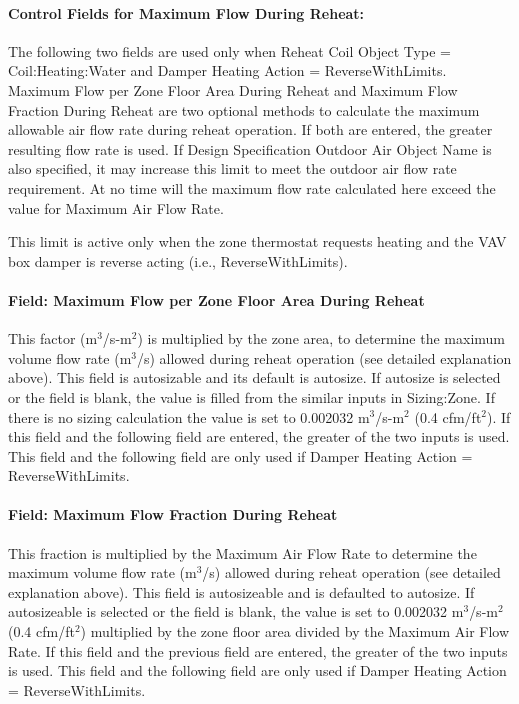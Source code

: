 \paragraph{Control Fields for Maximum Flow During Reheat:}\label{control-fields-for-maximum-flow-during-reheat}

The following two fields are used only when Reheat Coil Object Type = Coil:Heating:Water and Damper Heating Action = ReverseWithLimits. Maximum Flow per Zone Floor Area During Reheat and Maximum Flow Fraction During Reheat are two optional methods to calculate the maximum allowable air flow rate during reheat operation. If both are entered, the greater resulting flow rate is used. If Design Specification Outdoor Air Object Name is also specified, it may increase this limit to meet the outdoor air flow rate requirement. At no time will the maximum flow rate calculated here exceed the value for Maximum Air Flow Rate.

This limit is active only when the zone thermostat requests heating and the VAV box damper is reverse acting (i.e., ReverseWithLimits).

\paragraph{Field: Maximum Flow per Zone Floor Area During Reheat}\label{field-maximum-flow-per-zone-floor-area-during-reheat}

This factor (m\(^{3}\)/s-m\(^{2}\)) is multiplied by the zone area, to determine the maximum volume flow rate (m\(^{3}\)/s) allowed during reheat operation (see detailed explanation above). This field is autosizable and its default is autosize. If autosize is selected or the field is blank, the value is filled from the similar inputs in Sizing:Zone. If there is no sizing calculation the value is set to 0.002032 m\(^{3}\)/s-m\(^{2}\) (0.4 cfm/ft\(^{2}\)). If this field and the following field are entered, the greater of the two inputs is used. This field and the following field are only used if Damper Heating Action = ReverseWithLimits.

\paragraph{Field: Maximum Flow Fraction During Reheat}\label{field-maximum-flow-fraction-during-reheat}

This fraction is multiplied by the Maximum Air Flow Rate to determine the maximum volume flow rate (m\(^{3}\)/s) allowed during reheat operation (see detailed explanation above). This field is autosizeable and is defaulted to autosize. If autosizeable is selected or the field is blank, the value is set to 0.002032 m\(^{3}\)/s-m\(^{2}\) (0.4 cfm/ft\(^{2}\)) multiplied by the zone floor area divided by the Maximum Air Flow Rate. If this field and the previous field are entered, the greater of the two inputs is used. This field and the following field are only used if Damper Heating Action = ReverseWithLimits.


